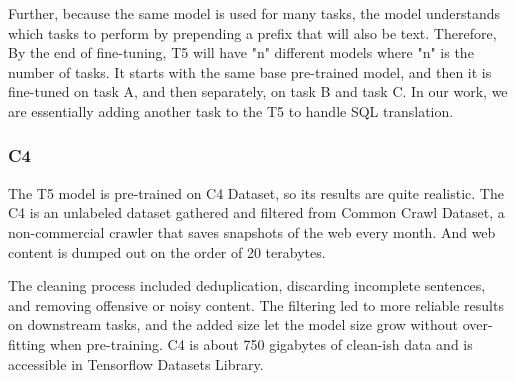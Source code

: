 Further, because the same model is used for many tasks, the model understands which tasks to perform by prepending a prefix that will also be text.
Therefore, By the end of fine-tuning, T5 will have "n" different models where "n" is the number of tasks. It starts with the same base pre-trained model, and then it is fine-tuned on task A, and then separately, on task B and task C. In our work, we are essentially adding another task to the T5 to handle SQL translation.

\subsubsection*{\ac{C4}}

The T5 model is pre-trained on C4 Dataset\cite{raffel_exploring_2020}, so its results are quite realistic.
The C4 is an unlabeled dataset gathered and filtered from Common Crawl Dataset, a non-commercial crawler that saves snapshots of the web every month. And web content is dumped out on the order of 20 terabytes.

The cleaning process included deduplication, discarding incomplete sentences, and removing offensive or noisy content. The filtering led to more reliable results on downstream tasks, and the added size let the model size grow without over-fitting when pre-training. C4 is about 750 gigabytes of clean-ish data and is accessible in Tensorflow Datasets Library.